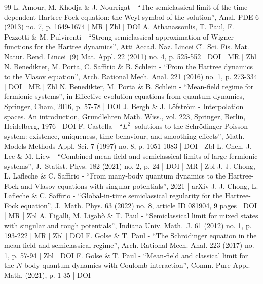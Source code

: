 \documentclass[10pt]{amsart}
\theoremstyle{definition}
\renewcommand {\(} {\lt(}
\renewcommand {\)} {\rt)}
\begin{document}
\begin{thebibliography}{99}
L. Amour, M. Khodja \& J. Nourrigat - “The semiclassical limit of the time dependent Hartree-Fock equation: the Weyl symbol of the solution”, Anal. PDE 6 (2013) no. 7, p. 1649-1674 | MR | Zbl | DOI
A. Athanassoulis, T. Paul, F. Pezzotti \& M. Pulvirenti - “Strong semiclassical approximation of Wigner functions for the Hartree dynamics”, Atti Accad. Naz. Lincei Cl. Sci. Fis. Mat. Natur. Rend. Lincei (9) Mat. Appl. 22 (2011) no. 4, p. 525-552 | DOI | MR | Zbl
N. Benedikter, M. Porta, C. Saffirio \& B. Schlein - “From the Hartree dynamics to the Vlasov equation”, Arch. Rational Mech. Anal. 221 (2016) no. 1, p. 273-334 | DOI | MR | Zbl
N. Benedikter, M. Porta \& B. Schlein - “Mean-field regime for fermionic systems”, in Effective evolution equations from quantum dynamics, Springer, Cham, 2016, p. 57-78 | DOI
J. Bergh \& J. Löfström - Interpolation spaces. An introduction, Grundlehren Math. Wiss., vol. 223, Springer, Berlin, Heidelberg, 1976 | DOI
F. Castella - “$L^2$- solutions to the Schrödinger-Poisson system: existence, uniqueness, time behaviour, and smoothing effects”, Math. Models Methods Appl. Sci. 7 (1997) no. 8, p. 1051-1083 | DOI | Zbl
L. Chen, J. Lee \& M. Liew - “Combined mean-field and semiclassical limits of large fermionic systems”, J. Statist. Phys. 182 (2021) no. 2, p. 24 | DOI | MR | Zbl
J. J. Chong, L. Lafleche \& C. Saffirio - “From many-body quantum dynamics to the Hartree-Fock and Vlasov equations with singular potentials”, 2021 | arXiv
J. J. Chong, L. Lafleche \& C. Saffirio - “Global-in-time semiclassical regularity for the Hartree-Fock equation”, J. Math. Phys. 63 (2022) no. 8, article ID 081904, 9 pages | DOI | MR | Zbl
A. Figalli, M. Ligabò \& T. Paul - “Semiclassical limit for mixed states with singular and rough potentials”, Indiana Univ. Math. J. 61 (2012) no. 1, p. 193-222 | MR | Zbl | DOI
F. Golse \& T. Paul - “The Schrödinger equation in the mean-field and semiclassical regime”, Arch. Rational Mech. Anal. 223 (2017) no. 1, p. 57-94 | Zbl | DOI
F. Golse \& T. Paul - “Mean-field and classical limit for the $N$-body quantum dynamics with Coulomb interaction”, Comm. Pure Appl. Math. (2021), p. 1-35 | DOI

\end{thebibliography}
\end{document}
